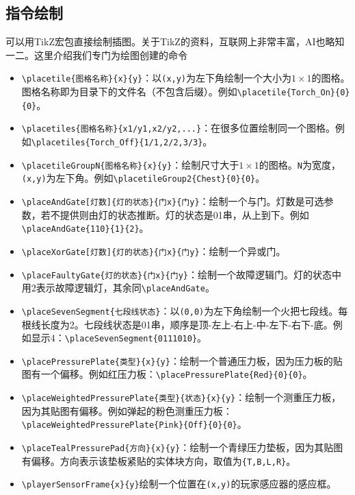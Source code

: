 \subsection{指令绘制}
可以用TikZ宏包直接绘制插图。关于TikZ的资料，互联网上非常丰富，AI也略知一二。这里介绍我们专门为\termTR 绘图创建的命令
\begin{itemize}
  \item \lstinline|\placetile{图格名称}{x}{y}|：以\lstinline{(x,y)}为左下角绘制一个大小为$1\times 1$的图格。图格名称即为目录下的文件名（不包含后缀）。例如\lstinline|\placetile{Torch_On}{0}{0}|。
  \item \lstinline|\placetiles{图格名称}{x1/y1,x2/y2,...}|：在很多位置绘制同一个图格。例如\lstinline|\placetiles{Torch_Off}{1/1,2/2,3/3}|。
  \item \lstinline|\placetileGroupN{图格名称}{x}{y}|：绘制尺寸大于$1\times 1$的图格。\lstinline{N}为宽度，\lstinline{(x,y)}为左下角。例如\lstinline|\placetileGroup2{Chest}{0}{0}|。
  \item \lstinline|\placeAndGate[灯数]{灯的状态}{门x}{门y}|：绘制一个与门。灯数是可选参数，若不提供则由灯的状态推断。灯的状态是01串，从上到下。例如\lstinline|\placeAndGate{110}{1}{2}|。
  \item \lstinline|\placeXorGate[灯数]{灯的状态}{门x}{门y}|：绘制一个异或门。
  \item \lstinline|\placeFaultyGate{灯的状态}{门x}{门y}|：绘制一个故障逻辑门。灯的状态中用2表示故障逻辑灯，其余同\lstinline{\placeAndGate}。
  \item \lstinline|\placeSevenSegment{七段线状态}|：以\lstinline{(0,0)}为左下角绘制一个火把七段线。每根线长度为2。七段线状态是01串，顺序是顶-左上-右上-中-左下-右下-底。例如显示4：\lstinline|\placeSevenSegment{0111010}|。
  \item \lstinline|\placePressurePlate{类型}{x}{y}|：绘制一个普通压力板，因为压力板的贴图有一个偏移。例如红压力板：\lstinline|\placePressurePlate{Red}{0}{0}|。
  \item \lstinline|\placeWeightedPressurePlate{类型}{状态}{x}{y}|：绘制一个测重压力板，因为其贴图有偏移。例如弹起的粉色测重压力板：\lstinline|\placeWeightedPressurePlate{Pink}{Off}{0}{0}|。
  \item \lstinline|\placeTealPressurePad{方向}{x}{y}|：绘制一个青绿压力垫板，因为其贴图有偏移。方向表示该垫板紧贴的实体块方向，取值为\lstinline|{T,B,L,R}|。
  \item \lstinline|\playerSensorFrame{x}{y}|绘制一个位置在\lstinline{(x,y)}的玩家感应器的感应框。
\end{itemize}

